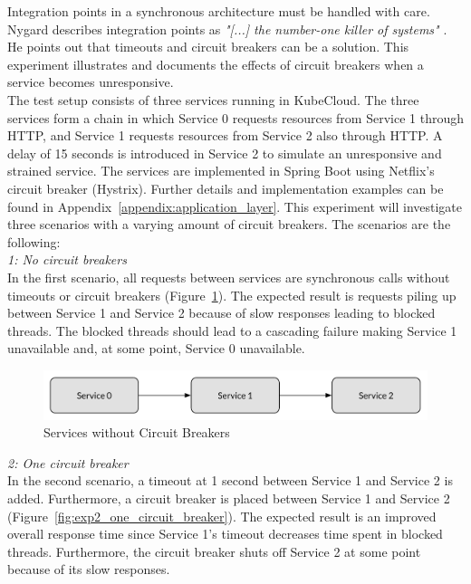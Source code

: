 \noindent
Integration points in a synchronous architecture must be handled with care. Nygard describes integration points as \textit{"[...] the number-one killer of systems"} \cite[p. 46]{nygard2007release}. He points out that timeouts and circuit breakers can be a solution. This experiment illustrates and documents the effects of circuit breakers when a service becomes unresponsive. \\

\noindent 
The test setup consists of three services running in KubeCloud. The three services form a chain in which Service 0 requests resources from Service 1 through HTTP, and Service 1 requests resources from Service 2 also through HTTP. A delay of 15 seconds is introduced in Service 2 to simulate an unresponsive and strained service. The services are implemented in Spring Boot using Netflix's circuit breaker (Hystrix). Further details and implementation examples can be found in Appendix~\ref{appendix:application_layer}. This experiment will investigate three scenarios with a varying amount of circuit breakers. The scenarios are the following: \\

\noindent
\textit{1: No circuit breakers}
\\
In the first scenario, all requests between services are synchronous calls without timeouts or circuit breakers (Figure~\ref{fig:exp2_no_circuit_breaker}). The expected result is requests piling up between Service 1 and Service 2 because of slow responses leading to blocked threads. The blocked threads should lead to a cascading failure making Service 1 unavailable and, at some point, Service 0 unavailable.

\begin{figure}[H]
\centering
\includegraphics[scale=0.5]{figures/no_circuit_breaker_3_services}
\caption{Services without Circuit Breakers}
\label{fig:exp2_no_circuit_breaker}
\end{figure}

\noindent
\textit{2: One circuit breaker}
\\
In the second scenario, a timeout at 1 second between Service 1 and Service 2 is added. Furthermore, a circuit breaker is placed between Service 1 and Service 2 (Figure~\ref{fig:exp2_one_circuit_breaker}). The expected result is an improved overall response time since Service 1's timeout decreases time spent in blocked threads. Furthermore, the circuit breaker shuts off Service 2 at some point because of its slow responses.


